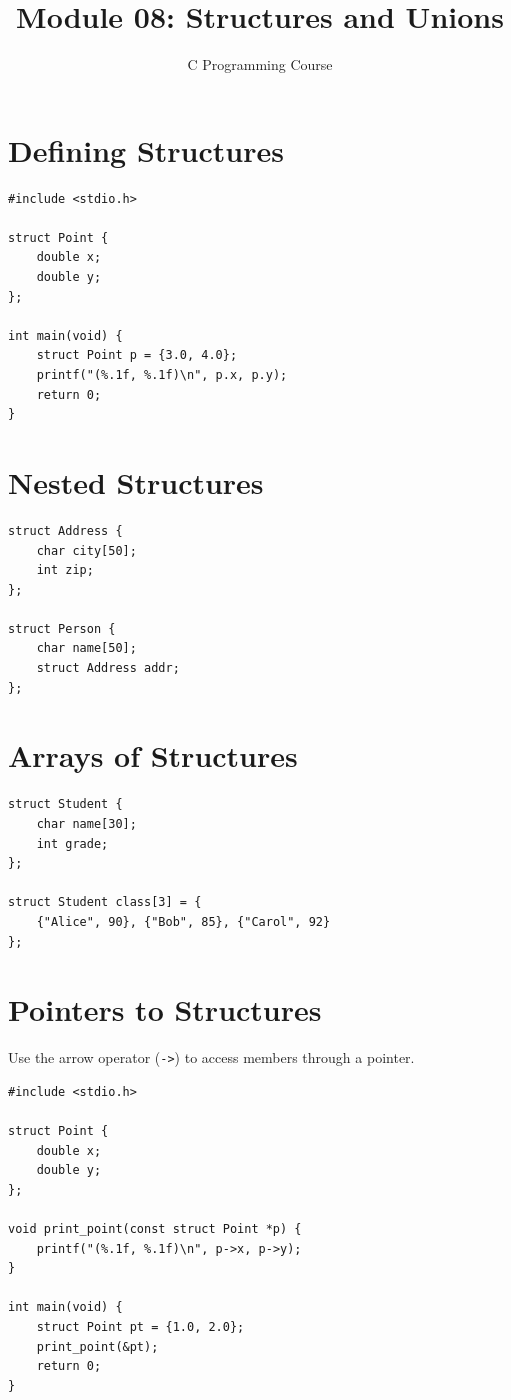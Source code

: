 \documentclass[11pt,a4paper]{article}
\title{Module 08: Structures and Unions}
\author{C Programming Course}
\date{}
\begin{document}
\maketitle
\thispagestyle{fancy}

\section{Defining Structures}
\begin{lstlisting}
#include <stdio.h>

struct Point {
    double x;
    double y;
};

int main(void) {
    struct Point p = {3.0, 4.0};
    printf("(%.1f, %.1f)\n", p.x, p.y);
    return 0;
}
\end{lstlisting}

\section{Nested Structures}
\begin{lstlisting}
struct Address {
    char city[50];
    int zip;
};

struct Person {
    char name[50];
    struct Address addr;
};
\end{lstlisting}

\section{Arrays of Structures}
\begin{lstlisting}
struct Student {
    char name[30];
    int grade;
};

struct Student class[3] = {
    {"Alice", 90}, {"Bob", 85}, {"Carol", 92}
};
\end{lstlisting}

\section{Pointers to Structures}
Use the arrow operator (\texttt{->}) to access members through a pointer.

\begin{lstlisting}
#include <stdio.h>

struct Point {
    double x;
    double y;
};

void print_point(const struct Point *p) {
    printf("(%.1f, %.1f)\n", p->x, p->y);
}

int main(void) {
    struct Point pt = {1.0, 2.0};
    print_point(&pt);
    return 0;
}
\end{lstlisting}
\end{document}
